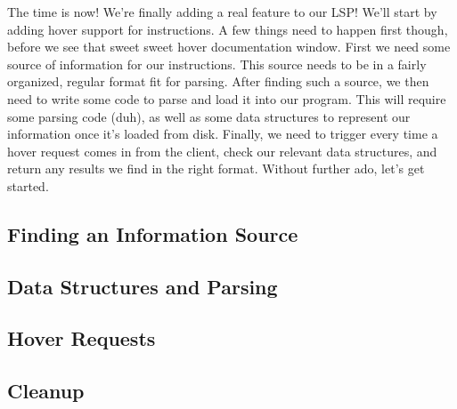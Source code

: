The time is now! We're finally adding a real feature to our LSP! We'll start by
adding hover support for instructions. A few things need to happen first though,
before we see that sweet sweet hover documentation window. First we need some 
source of information for our instructions. This source needs to be in a fairly
organized, regular format fit for parsing. After finding such a source, we then
need to write some code to parse and load it into our program. This will require
some parsing code (duh), as well as some data structures to represent our information
once it's loaded from disk. Finally, we need to trigger every time a hover request
comes in from the client, check our relevant data structures, and return any results
we find in the right format. Without further ado, let's get started.

\subsection{Finding an Information Source}


\subsection{Data Structures and Parsing}


\subsection{Hover Requests}



\subsection{Cleanup}







